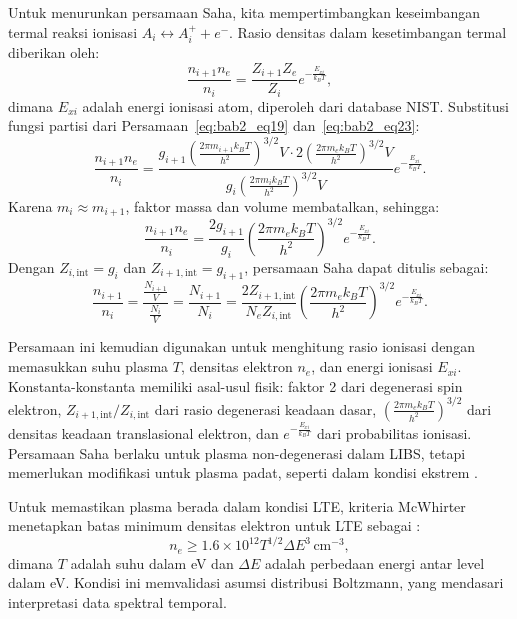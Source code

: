 Untuk menurunkan persamaan Saha, kita mempertimbangkan keseimbangan termal reaksi ionisasi \( A_i \leftrightarrow A_i^+ + e^- \). Rasio densitas dalam kesetimbangan termal diberikan oleh:
\begin{equation}
\frac{n_{i+1} n_e}{n_i} = \frac{Z_{i+1} Z_e}{Z_i} e^{-\frac{E_{xi}}{k_B T}}, \label{eq:bab2_eq24}
\end{equation}
dimana \( E_{xi} \) adalah energi ionisasi atom, diperoleh dari database NIST. Substitusi fungsi partisi dari Persamaan~\eqref{eq:bab2_eq19} dan~\eqref{eq:bab2_eq23}:
\begin{equation}
\frac{n_{i+1} n_e}{n_i} = \frac{g_{i+1} \left( \frac{2\pi m_{i+1} k_B T}{h^2} \right)^{3/2} V \cdot 2 \left( \frac{2\pi m_e k_B T}{h^2} \right)^{3/2} V}{g_i \left( \frac{2\pi m_i k_B T}{h^2} \right)^{3/2} V} e^{-\frac{E_{xi}}{k_B T}}. \label{eq:bab2_eq25}
\end{equation}
Karena \( m_i \approx m_{i+1} \), faktor massa dan volume membatalkan, sehingga:
\begin{equation}
\frac{n_{i+1} n_e}{n_i} = \frac{2 g_{i+1}}{g_i} \left( \frac{2\pi m_e k_B T}{h^2} \right)^{3/2} e^{-\frac{E_{xi}}{k_B T}}. \label{eq:bab2_eq26}
\end{equation}
Dengan \( Z_{i,\text{int}} = g_i \) dan \( Z_{i+1,\text{int}} = g_{i+1} \), persamaan Saha dapat ditulis sebagai:
\begin{equation}
\frac{n_{i+1}}{n_i} = \frac{\frac{N_{i+1}}{V}} {\frac{N_{i}}{V}}= \frac{N_{i+1}} {N_{i}} = \frac{2Z_{i+1,\text{int}}}{N_eZ_{i,\text{int}}} \left( \frac{2\pi m_e k_B T}{h^2} \right)^{3/2} e^{-\frac{E_{xi}}{k_B T}}. \label{eq:bab2_eq27}
\end{equation}

Persamaan ini kemudian digunakan untuk menghitung rasio ionisasi dengan memasukkan suhu plasma \( T \), densitas elektron \( n_e \), dan energi ionisasi \( E_{xi} \). Konstanta-konstanta memiliki asal-usul fisik: faktor 2 dari degenerasi spin elektron, \( Z_{i+1,\text{int}}/Z_{i,\text{int}} \) dari rasio degenerasi keadaan dasar, \( \left( \frac{2\pi m_e k_B T}{h^2} \right)^{3/2} \) dari densitas keadaan translasional elektron, dan \( e^{-\frac{E_{xi}}{k_B T}} \) dari probabilitas ionisasi. Persamaan Saha berlaku untuk plasma non-degenerasi dalam LIBS, tetapi memerlukan modifikasi untuk plasma padat, seperti dalam kondisi ekstrem \citep{Chandrasekhar1939}.

Untuk memastikan plasma berada dalam kondisi LTE, kriteria McWhirter menetapkan batas minimum densitas elektron untuk LTE sebagai \citep{McWhirter1965}:
\begin{equation}
n_e \geq 1.6 \times 10^{12} T^{1/2} \Delta E^3 \, \text{cm}^{-3}, \label{eq:bab2_eq28}
\end{equation}
dimana \( T \) adalah suhu dalam eV dan \( \Delta E \) adalah perbedaan energi antar level dalam eV. Kondisi ini memvalidasi asumsi distribusi Boltzmann, yang mendasari interpretasi data spektral temporal.


